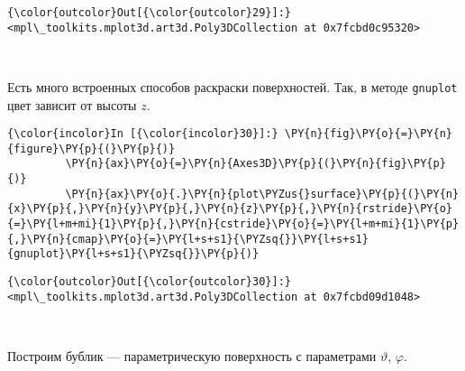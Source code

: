             \begin{Verbatim}[commandchars=\\\{\}]
{\color{outcolor}Out[{\color{outcolor}29}]:} <mpl\_toolkits.mplot3d.art3d.Poly3DCollection at 0x7fcbd0c95320>
\end{Verbatim}
        
    \begin{center}
    \end{center}
    { \hspace*{\fill} \\}
    
    Есть много встроенных способов раскраски поверхностей. Так, в методе
\texttt{gnuplot} цвет зависит от высоты \(z\).

    \begin{Verbatim}[commandchars=\\\{\}]
{\color{incolor}In [{\color{incolor}30}]:} \PY{n}{fig}\PY{o}{=}\PY{n}{figure}\PY{p}{(}\PY{p}{)}
         \PY{n}{ax}\PY{o}{=}\PY{n}{Axes3D}\PY{p}{(}\PY{n}{fig}\PY{p}{)}
         \PY{n}{ax}\PY{o}{.}\PY{n}{plot\PYZus{}surface}\PY{p}{(}\PY{n}{x}\PY{p}{,}\PY{n}{y}\PY{p}{,}\PY{n}{z}\PY{p}{,}\PY{n}{rstride}\PY{o}{=}\PY{l+m+mi}{1}\PY{p}{,}\PY{n}{cstride}\PY{o}{=}\PY{l+m+mi}{1}\PY{p}{,}\PY{n}{cmap}\PY{o}{=}\PY{l+s+s1}{\PYZsq{}}\PY{l+s+s1}{gnuplot}\PY{l+s+s1}{\PYZsq{}}\PY{p}{)}
\end{Verbatim}

            \begin{Verbatim}[commandchars=\\\{\}]
{\color{outcolor}Out[{\color{outcolor}30}]:} <mpl\_toolkits.mplot3d.art3d.Poly3DCollection at 0x7fcbd09d1048>
\end{Verbatim}
        
    \begin{center}
    \end{center}
    { \hspace*{\fill} \\}
    
    Построим бублик --- параметрическую поверхность с параметрами
\(\vartheta\), \(\varphi\).


